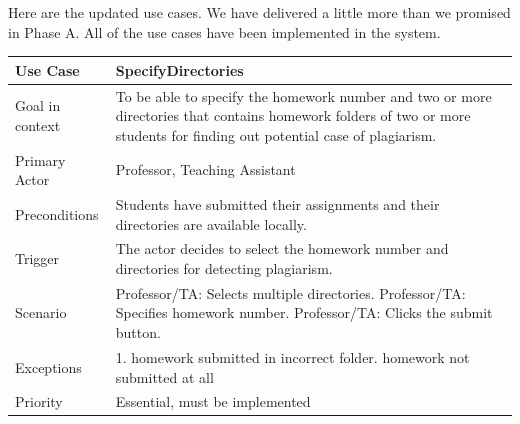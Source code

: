 \documentclass[12pt]{article}
\begin{document}



Here are the updated use cases. We have delivered a little more than we promised in Phase A. All of the use cases have been implemented in the system. \\[0.25 cm]


\begin{tabular}{ |p{3cm}||p{11.25cm}| }
 \hline
 \textbf{Use Case} & \textbf{SpecifyDirectories}\\
 \hline
 Goal in context & To be able to specify the homework number and two or more directories that contains homework folders of two or more students for finding out potential case of plagiarism. \\
 \hline
 Primary Actor & Professor, Teaching Assistant \\
 \hline
 Preconditions& Students have submitted their assignments and their directories are available locally. \\
 \hline
 Trigger &The actor decides to select the homework number and directories for detecting plagiarism.\\
 \hline
 Scenario    &Professor/TA: Selects multiple directories. \newline
Professor/TA: Specifies homework number. \newline
Professor/TA: Clicks the submit button.\\
\hline
 Exceptions&  
1. homework submitted in incorrect folder\newline
2. homework not submitted at all 
\\
\hline
 Priority& Essential, must be implemented \\
 \hline
\end{tabular} \\[2.0 em]
\end{document}
